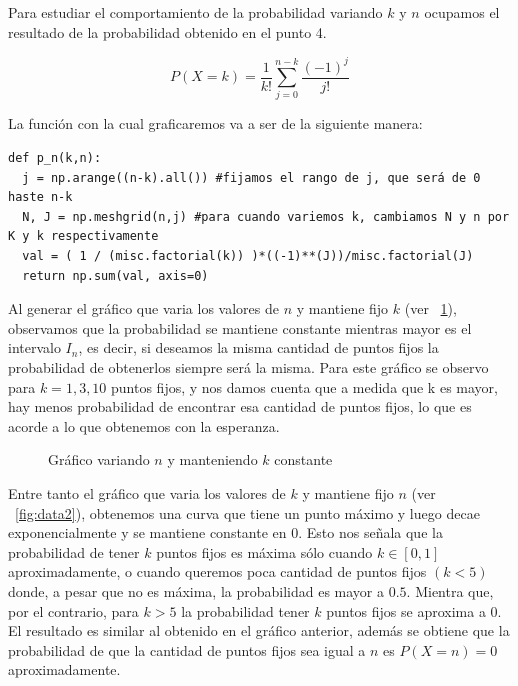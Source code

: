 \documentclass[letterpaper,10pt,table, dvipsnames]{article}
\newenvironment{code}{\captionsetup{type=listing}}{}
\newcommand{\figref}[1]{\figurename~\ref{#1}}
\begin{document}
Para estudiar el comportamiento de la probabilidad variando $k$ y $n$ ocupamos el resultado de la probabilidad obtenido en el punto 4.

\begin{equation*}
  P(X=k) = \frac{1}{k!} \sum_{j=0}^{n-k} \frac{(-1)^{j}}{j!}
\end{equation*}

\newpage

La función con la cual graficaremos va a ser de la siguiente manera:

\begin{code}
\begin{verbatim}
def p_n(k,n):
  j = np.arange((n-k).all()) #fijamos el rango de j, que será de 0 haste n-k
  N, J = np.meshgrid(n,j) #para cuando variemos k, cambiamos N y n por K y k respectivamente
  val = ( 1 / (misc.factorial(k)) )*((-1)**(J))/misc.factorial(J)
  return np.sum(val, axis=0)
\end{verbatim}
\label{code:proban}
\end{code}

Al generar el gráfico que varia los valores de $n$ y mantiene fijo $k$ (ver \figref{fig:data1}), observamos que la probabilidad se mantiene constante mientras mayor es el intervalo $I_n$, es decir, si deseamos la misma cantidad de puntos fijos la probabilidad de obtenerlos siempre será la misma. Para este gráfico se observo para $k=1,3,10$ puntos fijos, y nos damos cuenta que a medida que k es mayor, hay menos probabilidad de encontrar esa cantidad de puntos fijos, lo que es acorde a lo que obtenemos con la esperanza.\\

\begin{figure}[h]
  \centering
  
  \caption{Gráfico variando $n$ y manteniendo $k$ constante}\label{fig:data1}
\end{figure}
\newpage

Entre tanto el gráfico que varia los valores de $k$ y mantiene fijo $n$ (ver \figref{fig:data2}), obtenemos una curva que tiene un punto máximo y luego decae exponencialmente y se mantiene constante en $0$. Esto nos señala que la probabilidad de tener $k$ puntos fijos es máxima sólo cuando $k \in [0,1]$ aproximadamente, o cuando queremos poca cantidad de puntos fijos $(k<5)$ donde, a pesar que no es máxima, la probabilidad es mayor a $0.5$. Mientra que, por el contrario, para $k>5$ la probabilidad tener $k$ puntos fijos se aproxima a 0. El resultado es similar al obtenido en el gráfico anterior, además se obtiene que la probabilidad de que la cantidad de puntos fijos sea igual a $n$ es $P(X=n)=0$ aproximadamente.\\
\end{document}
